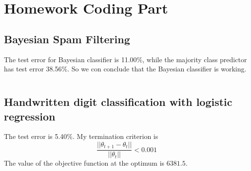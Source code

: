 \documentclass[12pt]{article}
\begin{document}
\setcounter{section}{1}
\section{Homework Coding Part}
\setcounter{subsection}{1}
\subsection{Bayesian Spam Filtering}
The test error for Bayesian classifier is 11.00\%, while the majority class predictor has test error 38.56\%.
So we con conclude that the Bayesian classifier is working.
\inputminted[linenos,bgcolor=black]{octave}{./hw2/problem2/Bayesian_spam_filtering.m}
\setcounter{subsection}{3}
\subsection{Handwritten digit classification with logistic regression}
The test error is 5.40\%.
My termination criterion is
\[ \frac{||\theta_{t+1}-\theta_{t}||}{||\theta_t||}<0.001 \]
The value of the objective function at the optimum is \(6381.5\).
\end{document}
